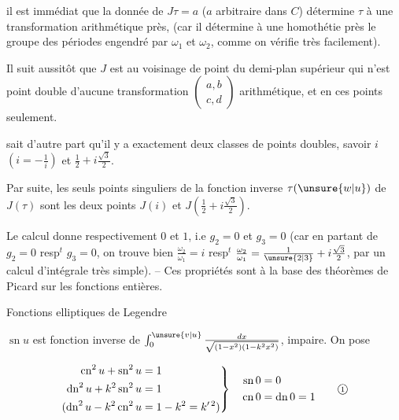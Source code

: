 il est immédiat que la donnée de $J\tau=a$ ($a$ arbitraire dans $C$) détermine $\tau$ à une transformation arithmétique près, (car il détermine à une homothétie près le groupe des périodes engendré par $\omega_1$ et $\omega_2$, comme on vérifie très facilement).

Il suit aussitôt que $J$ est  au voisinage de  point du demi-plan supérieur qui n'est point double d'aucune transformation $\left(\begin{smallmatrix}a,b\\c,d\end{smallmatrix}\right)$ arithmétique, et en ces points seulement.

 sait d'autre part qu'il y a exactement deux classes de points doubles, savoir $i$ $(i=-\frac1i)$ et $\frac12+i\frac{\sqrt3}{2}$.

Par suite, les seuls points singuliers  de la fonction inverse $\tau(\unsure{w|u})$ de $J(\tau)$ sont les deux points $J(i)$ et $J(\frac12+i\frac{\sqrt3}{2})$.

Le calcul donne respectivement $0$ et $1$, i.e $g_2=0$ et $g_3=0$ (car en partant de $g_2=0$ resp$^t$ $g_3=0$, on trouve bien $\frac{\omega_2}{\omega_1}=i$ resp$^t$ $\frac{\omega_2}{\omega_1}=\frac1{\unsure{2|3}}+i\frac{\sqrt3}{2}$, par un calcul d'intégrale très simple). -- Ces propriétés sont à la base des théorèmes de Picard sur les fonctions entières.

\begin{center}Fonctions elliptiques de Legendre\end{center}

$\operatorname{sn}u$ est fonction inverse de $\int_0^{\unsure{v|u}}\frac{dx}{\sqrt{(1-x^2)(1-k^2x^2)}}$, impaire. On pose

\[
\left.\begin{aligned}
\operatorname{cn}^2u+\operatorname{sn}^2u&=1\\
\operatorname{dn}^2u+k^2\operatorname{sn}^2u&=1\\
(\operatorname{dn}^2u-k^2\operatorname{cn}^2u&=1-k^2=k'^{\,2})
\end{aligned}\right\}
\quad\begin{aligned}\operatorname{sn}0&=0\\\operatorname{cn}0&=\operatorname{dn}0=1\end{aligned}
\tag*{\textcircled{\scriptsize 1}}
\]

